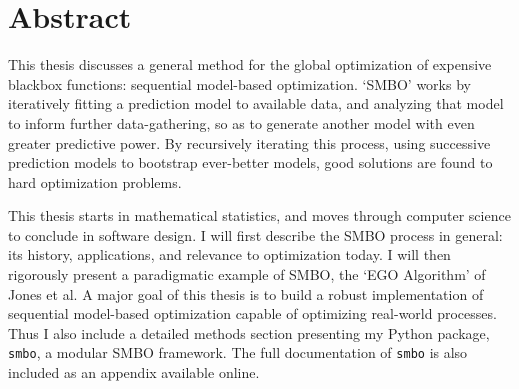 \chapter*{Abstract}

This thesis discusses a general method for the global optimization of expensive blackbox functions: sequential model-based optimization. `SMBO' works by iteratively fitting a prediction model to available data, and analyzing that model to inform further data-gathering, so as to generate another model with even greater predictive power. By recursively iterating this process, using successive prediction models to bootstrap ever-better models, good solutions are found to hard optimization problems.

This thesis starts in mathematical statistics, and moves through computer science to conclude in software design. I will first describe the SMBO process in general: its history, applications, and relevance to optimization today. I will then rigorously present a paradigmatic example of SMBO, the `EGO Algorithm' of Jones et al. A major goal of this thesis is to build a robust implementation of sequential model-based optimization capable of optimizing real-world processes. Thus I also include a detailed methods section presenting my Python package, \texttt{smbo}, a modular SMBO framework. The full documentation of \texttt{smbo} is also included as an appendix available online.